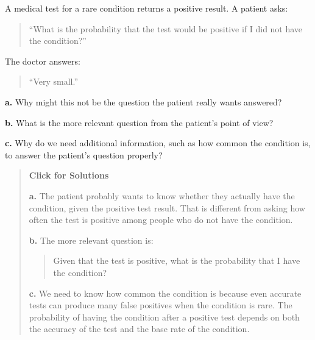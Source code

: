 \documentclass[
  letterpaper,
  DIV=11,
  numbers=noendperiod]{scrreprt}
\begin{document}
\begin{tcolorbox}[enhanced jigsaw, arc=.35mm, bottomrule=.15mm, bottomtitle=1mm, breakable, colback=white, colbacktitle=quarto-callout-note-color!10!white, colframe=quarto-callout-note-color-frame, coltitle=black, left=2mm, leftrule=.75mm, opacityback=0, opacitybacktitle=0.6, rightrule=.15mm, title=\textcolor{quarto-callout-note-color}{\faInfo}\hspace{0.5em}{Question 13}, titlerule=0mm, toprule=.15mm, toptitle=1mm]

A medical test for a rare condition returns a positive result. A patient
asks:

\begin{quote}
``What is the probability that the test would be positive if I did not
have the condition?''
\end{quote}

The doctor answers:

\begin{quote}
``Very small.''
\end{quote}

\textbf{a.} Why might this not be the question the patient really wants
answered?

\textbf{b.} What is the more relevant question from the patient's point
of view?

\textbf{c.} Why do we need additional information, such as how common
the condition is, to answer the patient's question properly?

\begin{quote}
\textbf{Click for Solutions}

\textbf{a.} The patient probably wants to know whether they actually
have the condition, given the positive test result. That is different
from asking how often the test is positive among people who do not have
the condition.

\textbf{b.} The more relevant question is:

\begin{quote}
Given that the test is positive, what is the probability that I have the
condition?
\end{quote}

\textbf{c.} We need to know how common the condition is because even
accurate tests can produce many false positives when the condition is
rare. The probability of having the condition after a positive test
depends on both the accuracy of the test and the base rate of the
condition.
\end{quote}

\end{tcolorbox}
\end{document}

